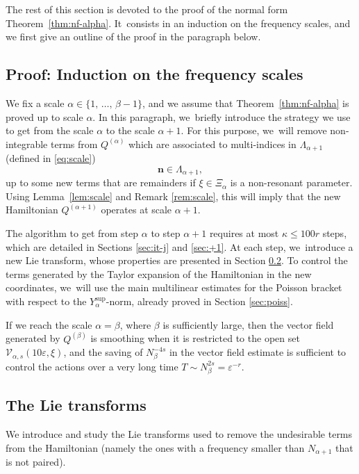 \documentclass[JEP,XML,SOM,Unicode,published]{cedram}
\theoremstyle{plain}
\theoremstyle{definition}
\newcommand{\nb}{{\boldsymbol n}}
\newcommand{\1}{\mathbf{1}}
\newcommand{\Ysup}[1]{Y_{#1}^{\mathrm{sup}}}
\let\epsilon\varepsilon
\begin{document}
The rest of this section is devoted to the proof of the normal form Theorem~\ref{thm:nf-alpha}. It~consists in an induction on the frequency scales, and we first give an outline of the proof in the paragraph below.

\subsection{Proof: Induction on the frequency scales}
\label{sec:proof-nf}
We fix a scale $\alpha\in\{1,\,\dots,\,\beta-1\}$, and we assume that Theorem~\ref{thm:nf-alpha} is proved up to scale $\alpha$. In this paragraph, we~briefly introduce the strategy we use to get from the scale $\alpha$ to the scale $\alpha+1$. For this purpose, we~will remove non-integrable terms from $Q^{(\alpha)}$ which are associated to multi-indices in $\Lambda_{\alpha+1}$ (defined in \eqref{eq:scale})
\[
\nb\in\Lambda_{\alpha+1},
\]
up to some new terms that are remainders if $\xi\in\Xi_{\alpha}$ is a non-resonant parameter. Using Lemma~\ref{lem:scale} and Remark \ref{rem:scale}, this will imply that the new Hamiltonian
$Q^{(\alpha+1)}$ operates at scale $\alpha+1$.

The algorithm to get from step $\alpha$ to step $\alpha+1$ requires at most $\kappa\leq 100r$ steps, which are detailed in Sections \ref{sec:it-j} and \ref{sec:+1}. At each step, we~introduce a new Lie transform, whose properties are presented in Section \ref{sec:lie}. To control the terms generated by the Taylor expansion of the Hamiltonian in the new coordinates, we~will use the main multilinear estimates for the Poisson bracket with respect to the $\Ysup{\alpha}$-norm, already proved in Section \ref{sec:poiss}.

If we reach the scale $\alpha=\beta$, where $\beta$ is sufficiently large, then the vector field generated by $Q^{(\beta)}$ is smoothing when it is restricted to the open set $\mathcal{V}_{\alpha,s}(10\epsilon,\xi)$, and the saving of $N_{\beta}^{-4s}$ in the vector field estimate is sufficient to control the actions over a very long time $T\sim N_{\beta}^{2s}=\epsilon^{-r}$.

\subsection{The Lie transforms}
\label{sec:lie}
We introduce and study the Lie transforms used to remove the undesirable terms from the Hamiltonian (namely the ones with a frequency smaller than $N_{\alpha+1}$ that is not paired).
\end{document}
